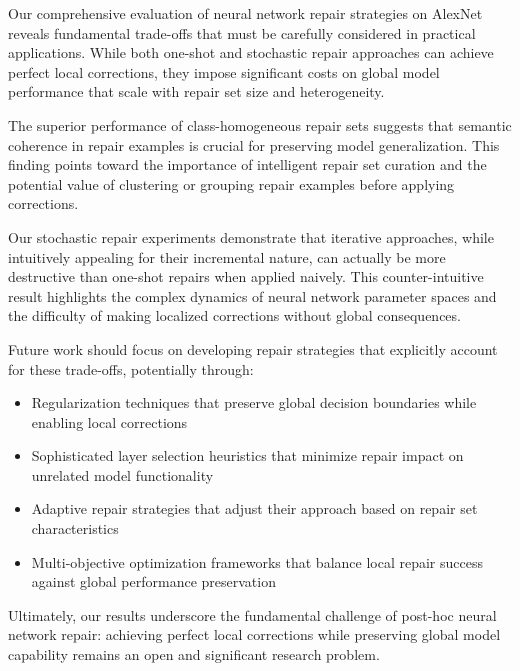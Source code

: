 \documentclass{article}
\begin{document}
Our comprehensive evaluation of neural network repair strategies on AlexNet reveals fundamental trade-offs that must be carefully considered in practical applications. While both one-shot and stochastic repair approaches can achieve perfect local corrections, they impose significant costs on global model performance that scale with repair set size and heterogeneity.

The superior performance of class-homogeneous repair sets suggests that semantic coherence in repair examples is crucial for preserving model generalization. This finding points toward the importance of intelligent repair set curation and the potential value of clustering or grouping repair examples before applying corrections.

Our stochastic repair experiments demonstrate that iterative approaches, while intuitively appealing for their incremental nature, can actually be more destructive than one-shot repairs when applied naively. This counter-intuitive result highlights the complex dynamics of neural network parameter spaces and the difficulty of making localized corrections without global consequences.

Future work should focus on developing repair strategies that explicitly account for these trade-offs, potentially through:
\begin{itemize}
	\item Regularization techniques that preserve global decision boundaries while enabling local corrections
	\item Sophisticated layer selection heuristics that minimize repair impact on unrelated model functionality
	\item Adaptive repair strategies that adjust their approach based on repair set characteristics
	\item Multi-objective optimization frameworks that balance local repair success against global performance preservation
\end{itemize}

Ultimately, our results underscore the fundamental challenge of post-hoc neural network repair: achieving perfect local corrections while preserving global model capability remains an open and significant research problem.





\end{document}
